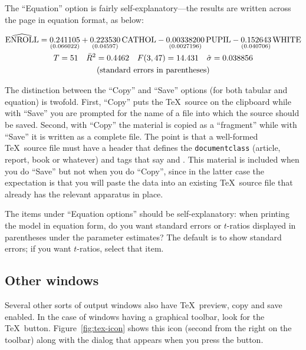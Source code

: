 The ``Equation'' option is fairly self-explanatory---the results are
written across the page in equation format, as below:


\begin{gather}
\widehat{\rm ENROLL} = 
\underset{(0.066022)}{0.241105}
+\underset{(0.04597)}{0.223530}\,\mbox{CATHOL}
-\underset{(0.0027196)}{0.00338200}\,\mbox{PUPIL}
-\underset{(0.040706)}{0.152643}\,\mbox{WHITE}
 \notag \\
T = 51 \quad \bar{R}^2 = 0.4462 \quad F(3,47) = 14.431 \quad \hat{\sigma} = 0.038856\notag \\
\centerline{(standard errors in parentheses)} \notag
\end{gather}

The distinction between the ``Copy'' and ``Save'' options (for both
tabular and equation) is twofold.  First, ``Copy'' puts the \TeX\
source on the clipboard while with ``Save'' you are prompted for the
name of a file into which the source should be saved.  Second, with
``Copy'' the material is copied as a ``fragment'' while with ``Save''
it is written as a complete file.  The point is that a well-formed
\TeX\ source file must have a header that defines the
\texttt{documentclass} (article, report, book or whatever) and tags
that say \verb|| and \verb||.  This
material is included when you do ``Save'' but not when you do
``Copy'', since in the latter case the expectation is that you will
paste the data into an existing \TeX\ source file that already has the
relevant apparatus in place.

The items under ``Equation options'' should be self-explanatory: when
printing the model in equation form, do you want standard errors or
$t$-ratios displayed in parentheses under the parameter estimates?
The default is to show standard errors; if you want $t$-ratios, select
that item.  

\subsection{Other windows}

Several other sorts of output windows also have \TeX\ preview, copy
and save enabled.  In the case of windows having a graphical toolbar,
look for the \TeX\ button.  Figure~\ref{fig:tex-icon} shows this icon
(second from the right on the toolbar) along with the dialog that
appears when you press the button.

